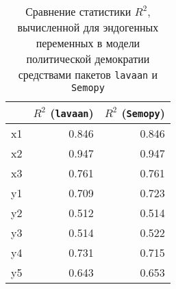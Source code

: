 \begin{table}[H]
	\centering
	\begin{tabular}{lrr}
		\toprule
		{} &  $ R^2 $ (\texttt{lavaan}) &  $ R^2 $ (\texttt{Semopy}) \\
		\midrule
		x1 &  0.846 &  0.846 \\
		x2 &  0.947 &  0.947 \\
		x3 &  0.761 &  0.761 \\
		y1 &  0.709 &  0.723 \\
		y2 &  0.512 &  0.514 \\
		y3 &  0.514 &  0.522 \\
		y4 &  0.731 &  0.715 \\
		y5 &  0.643 &  0.653 \\
		\bottomrule
	\end{tabular}
	\caption{Сравнение статистики $ R^2 $, вычисленной для эндогенных переменных в модели политической демократии средствами пакетов \texttt{lavaan} и \texttt{Semopy}}
	\label{table:r2}
\end{table}